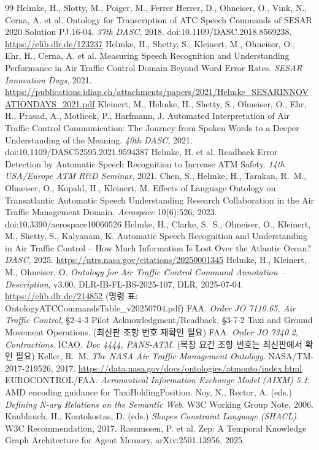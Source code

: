 \documentclass[10pt,a4paper]{article}
\begin{document}
\begin{thebibliography}{99}\small
{} Helmke, H., Slotty, M., Poiger, M., Ferrer Herrer, D., Ohneiser, O., Vink, N., Cerna, A. et al. Ontology for Transcription of ATC Speech Commands of SESAR 2020 Solution PJ.16-04. \emph{37th DASC}, 2018. doi:10.1109/DASC.2018.8569238. \url{https://elib.dlr.de/123237}
 Helmke, H., Shetty, S., Kleinert, M., Ohneiser, O., Ehr, H., Cerna, A. et al. Measuring Speech Recognition and Understanding Performance in Air Traffic Control Domain Beyond Word Error Rates. \emph{SESAR Innovation Days}, 2021. \url{https://publications.idiap.ch/attachments/papers/2021/Helmke_SESARINNOVATIONDAYS_2021.pdf}
 Kleinert, M., Helmke, H., Shetty, S., Ohneiser, O., Ehr, H., Prasad, A., Motlicek, P., Harfmann, J. Automated Interpretation of Air Traffic Control Communication: The Journey from Spoken Words to a Deeper Understanding of the Meaning. \emph{40th DASC}, 2021. doi:10.1109/DASC52595.2021.9594387
 Helmke, H. et al. Readback Error Detection by Automatic Speech Recognition to Increase ATM Safety. \emph{14th USA/Europe ATM R\&D Seminar}, 2021.
 Chen, S., Helmke, H., Tarakan, R.~M., Ohneiser, O., Kopald, H., Kleinert, M. Effects of Language Ontology on Transatlantic Automatic Speech Understanding Research Collaboration in the Air Traffic Management Domain. \emph{Aerospace} 10(6):526, 2023. doi:10.3390/aerospace10060526
 Helmke, H., Clarke, S.~S., Ohneiser, O., Kleinert, M., Shetty, S., Kalyanam, K. Automatic Speech Recognition and Understanding in Air Traffic Control -- How Much Information Is Lost Over the Atlantic Ocean? \emph{DASC}, 2025. \url{https://ntrs.nasa.gov/citations/20250001345}
 Helmke, H., Kleinert, M., Ohneiser, O. \emph{Ontology for Air Traffic Control Command Annotation -- Description}, v3.00. DLR-IB-FL-BS-2025-107, DLR, 2025-07-04. \url{https://elib.dlr.de/214852} (명령 표: OntologyATCCommandsTable\_v20250704.pdf)
 FAA. \emph{Order JO 7110.65, Air Traffic Control}, §2-4-3 Pilot Acknowledgment/Readback, §3-7-2 Taxi and Ground Movement Operations. (최신판 조항 번호 재확인 필요)
 FAA. \emph{Order JO 7340.2, Contractions}.
 ICAO. \emph{Doc 4444, PANS-ATM}. (복창 요건 조항 번호는 최신판에서 확인 필요)
 Keller, R.~M. \emph{The NASA Air Traffic Management Ontology}. NASA/TM-2017-219526, 2017. \url{https://data.nasa.gov/docs/ontologies/atmonto/index.html}
 EUROCONTROL/FAA. \emph{Aeronautical Information Exchange Model (AIXM) 5.1}; AMD encoding guidance for TaxiHoldingPosition.
 Noy, N., Rector, A. (eds.) \emph{Defining N-ary Relations on the Semantic Web}. W3C Working Group Note, 2006.
 Knublauch, H., Kontokostas, D. (eds.) \emph{Shapes Constraint Language (SHACL)}. W3C Recommendation, 2017.
 Rasmussen, P. et al. Zep: A Temporal Knowledge Graph Architecture for Agent Memory. arXiv:2501.13956, 2025.
\end{thebibliography}
\end{document}
